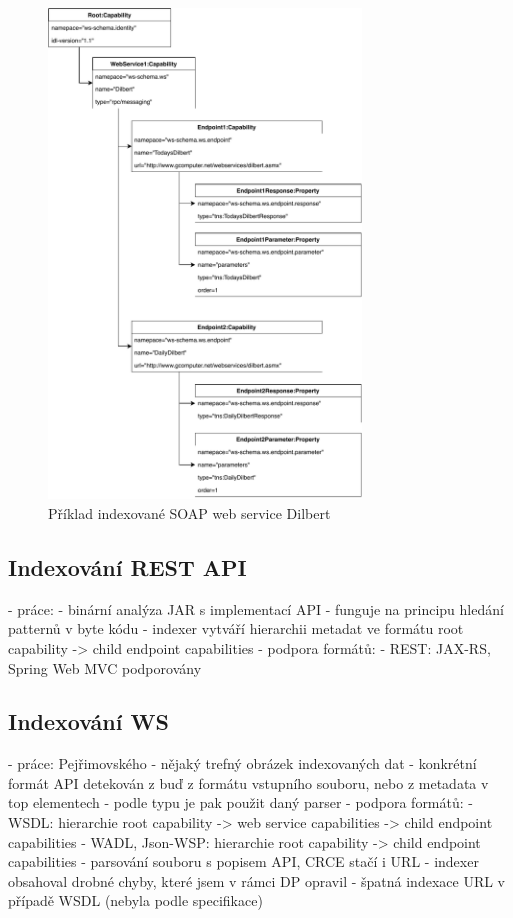 \documentclass[czech,DP]{thesiskiv}
\begin{document}
 \begin{figure}[h]
	\centering
	\includegraphics[height=13cm]{indexed-api-example}
	\caption{Příklad indexované SOAP web service Dilbert }
	\label{fig:indexed-api-example}
\end{figure}

\subsection{Indexování REST API}

- práce: \cite{hessova2015rest}
- binární analýza JAR s implementací API
- funguje na principu hledání patternů v byte kódu
- indexer vytváří hierarchii metadat ve formátu root capability -> child endpoint capabilities
- podpora formátů:
	- REST: JAX-RS, Spring Web MVC podporovány

\subsection{Indexování WS}

- práce: Pejřimovského \cite{pejrimovsky2015ws}
- nějaký trefný obrázek indexovaných dat
- konkrétní formát API detekován z buď z formátu vstupního souboru, nebo z metadata v top elementech
- podle typu je pak použit daný parser
- podpora formátů:
	- WSDL: hierarchie root capability -> web service capabilities -> child endpoint capabilities
	- WADL, Json-WSP: hierarchie root capability -> child endpoint capabilities
	- parsování souboru s popisem API, CRCE stačí i URL
- indexer obsahoval drobné chyby, které jsem v rámci DP opravil
	- špatná indexace URL v případě WSDL (nebyla podle specifikace)
\end{document}
